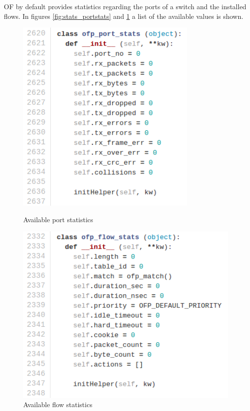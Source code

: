 \documentclass[12pt,english,oneside]{book}
\begin{document}
OF by default provides statistics regarding the ports of a switch and the installed flows. In figures \ref{fig:stats_portstats} and \ref{fig:stats_flowstats} a list of the available values is shown.

\begin{figure}[h!tbp]
\centering
\begin{minipage}{.5\textwidth}
  \centering
  \includegraphics[width=0.8\textwidth]{figures/stats_portstats.png}
  \caption{Available port statistics}
  \label{fig:stats_portstats}
\end{minipage}%
\begin{minipage}{.5\textwidth}
  \centering
  \includegraphics[width=1\textwidth]{figures/stats_flowstats.png}
  \caption{Available flow statistics}
  \label{fig:stats_flowstats}
\end{minipage}%
\end{figure}
\end{document}
